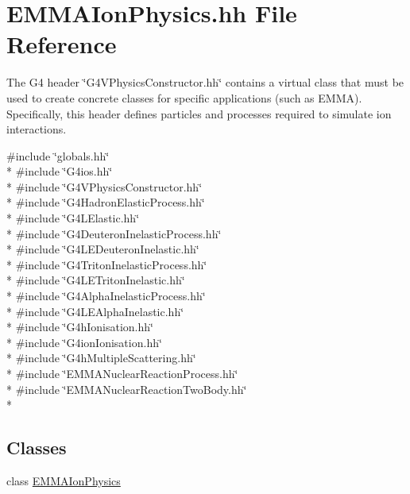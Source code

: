 \hypertarget{EMMAIonPhysics_8hh}{\section{E\-M\-M\-A\-Ion\-Physics.\-hh File Reference}
\label{EMMAIonPhysics_8hh}
}


The G4 header \char`\"{}\-G4\-V\-Physics\-Constructor.\-hh\char`\"{} contains a virtual class that must be used to create concrete classes for specific applications (such as E\-M\-M\-A). Specifically, this header defines particles and processes required to simulate ion interactions.  


{\ttfamily \#include \char`\"{}globals.\-hh\char`\"{}}\\*
{\ttfamily \#include \char`\"{}G4ios.\-hh\char`\"{}}\\*
{\ttfamily \#include \char`\"{}G4\-V\-Physics\-Constructor.\-hh\char`\"{}}\\*
{\ttfamily \#include \char`\"{}G4\-Hadron\-Elastic\-Process.\-hh\char`\"{}}\\*
{\ttfamily \#include \char`\"{}G4\-L\-Elastic.\-hh\char`\"{}}\\*
{\ttfamily \#include \char`\"{}G4\-Deuteron\-Inelastic\-Process.\-hh\char`\"{}}\\*
{\ttfamily \#include \char`\"{}G4\-L\-E\-Deuteron\-Inelastic.\-hh\char`\"{}}\\*
{\ttfamily \#include \char`\"{}G4\-Triton\-Inelastic\-Process.\-hh\char`\"{}}\\*
{\ttfamily \#include \char`\"{}G4\-L\-E\-Triton\-Inelastic.\-hh\char`\"{}}\\*
{\ttfamily \#include \char`\"{}G4\-Alpha\-Inelastic\-Process.\-hh\char`\"{}}\\*
{\ttfamily \#include \char`\"{}G4\-L\-E\-Alpha\-Inelastic.\-hh\char`\"{}}\\*
{\ttfamily \#include \char`\"{}G4h\-Ionisation.\-hh\char`\"{}}\\*
{\ttfamily \#include \char`\"{}G4ion\-Ionisation.\-hh\char`\"{}}\\*
{\ttfamily \#include \char`\"{}G4h\-Multiple\-Scattering.\-hh\char`\"{}}\\*
{\ttfamily \#include \char`\"{}E\-M\-M\-A\-Nuclear\-Reaction\-Process.\-hh\char`\"{}}\\*
{\ttfamily \#include \char`\"{}E\-M\-M\-A\-Nuclear\-Reaction\-Two\-Body.\-hh\char`\"{}}\\*
\subsection*{Classes}
\begin{DoxyCompactItemize}
\item 
class \hyperlink{classEMMAIonPhysics}{E\-M\-M\-A\-Ion\-Physics}
\end{DoxyCompactItemize}


